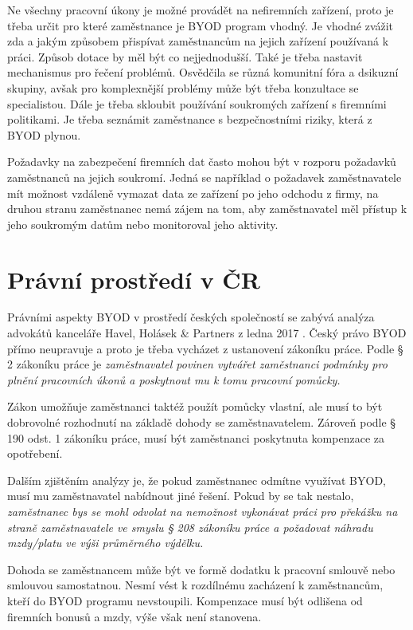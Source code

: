 Ne všechny pracovní úkony je možné provádět na nefiremních zařízení, proto je třeba určit pro které zaměstnance je BYOD program vhodný. 
Je vhodné zvážit zda a jakým způsobem přispívat zaměstnancům na jejich zařízení používaná k práci. Způsob dotace by měl být co nejjednodušší. Také je třeba nastavit mechanismus pro řečení problémů. Osvědčila se různá komunitní fóra a dsikuzní skupiny, avšak pro komplexnější problémy může být třeba konzultace se specialistou. Dále je třeba skloubit používání soukromých zařízení s firemními politikami. Je třeba seznámit zaměstnance s bezpečnostními riziky, která z BYOD plynou. 

Požadavky na zabezpečení firemních dat často mohou být v rozporu požadavků zaměstnanců na jejich soukromí. Jedná se například o požadavek zaměstnavatele mít možnost vzdáleně vymazat data ze zařízení po jeho odchodu z firmy, na druhou stranu zaměstnanec nemá zájem na tom, aby zaměstnavatel měl přístup k jeho soukromým datům nebo monitoroval jeho aktivity.

\section{Právní prostředí v ČR}

Právními aspekty BYOD v prostředí českých společností se zabývá analýza advokátů kanceláře Havel, Holásek \& Partners z ledna 2017 . Český právo BYOD přímo neupravuje a proto je třeba vycházet z ustanovení zákoníku práce. Podle § 2 zákoníku práce je \textit{zaměstnavatel povinen vytvářet zaměstnanci podmínky pro plnění pracovních úkonů a poskytnout mu k tomu pracovní pomůcky.}

Zákon umožňuje zaměstnanci taktéž použít pomůcky vlastní, ale musí to být dobrovolné rozhodnutí na základě dohody se zaměstnavatelem. Zároveň podle § 190 odst. 1  zákoníku práce, musí být zaměstnanci poskytnuta kompenzace za opotřebení.

Dalším zjištěním analýzy je, že pokud zaměstnanec odmítne využívat BYOD, musí mu zaměstnavatel nabídnout jiné řešení. Pokud by se tak nestalo, \textit{zaměstnanec bys se mohl odvolat na nemožnost vykonávat práci pro překážku na straně zaměstnavatele ve smyslu § 208 zákoníku práce a požadovat náhradu mzdy/platu ve výši průměrného výdělku.}

Dohoda se zaměstnancem může být ve formě dodatku k pracovní smlouvě nebo smlouvou samostatnou. Nesmí vést k rozdílnému zacházení k zaměstnancům, kteří do BYOD programu nevstoupili. Kompenzace musí být odlišena od firemních bonusů a mzdy, výše však není stanovena. 

